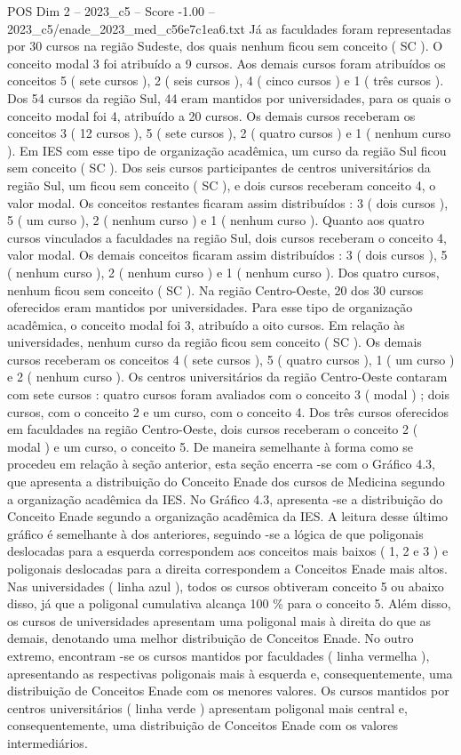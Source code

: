 \begin{textsample}{POS Dim 2 – 2023\_c5 – Score -1.00 – 2023\_c5/enade\_2023\_med\_c56e7c1ea6.txt}
Já as faculdades foram representadas por 30 cursos na região Sudeste, dos quais nenhum ficou sem conceito ( SC ).
O conceito modal 3 foi atribuído a 9 cursos.
Aos demais cursos foram atribuídos os conceitos 5 ( sete cursos ), 2 ( seis cursos ), 4 ( cinco cursos ) e 1 ( três cursos ).
Dos 54 cursos da região Sul, 44 eram mantidos por universidades, para os quais o conceito modal foi 4, atribuído a 20 cursos.
Os demais cursos receberam os conceitos 3 ( 12 cursos ), 5 ( sete cursos ), 2 ( quatro cursos ) e 1 ( nenhum curso ).
Em IES com esse tipo de organização acadêmica, um curso da região Sul ficou sem conceito ( SC ).
Dos seis cursos participantes de centros universitários da região Sul, um ficou sem conceito ( SC ), e dois cursos receberam conceito 4, o valor modal.
Os conceitos restantes ficaram assim distribuídos : 3 ( dois cursos ), 5 ( um curso ), 2 ( nenhum curso ) e 1 ( nenhum curso ).
Quanto aos quatro cursos vinculados a faculdades na região Sul, dois cursos receberam o conceito 4, valor modal.
Os demais conceitos ficaram assim distribuídos : 3 ( dois cursos ), 5 ( nenhum curso ), 2 ( nenhum curso ) e 1 ( nenhum curso ).
Dos quatro cursos, nenhum ficou sem conceito ( SC ).
Na região Centro-Oeste, 20 dos 30 cursos oferecidos eram mantidos por universidades.
Para esse tipo de organização acadêmica, o conceito modal foi 3, atribuído a oito cursos.
Em relação às universidades, nenhum curso da região ficou sem conceito ( SC ).
Os demais cursos receberam os conceitos 4 ( sete cursos ), 5 ( quatro cursos ), 1 ( um curso ) e 2 ( nenhum curso ).
Os centros universitários da região Centro-Oeste contaram com sete cursos : quatro cursos foram avaliados com o conceito 3 ( modal ) ; dois cursos, com o conceito 2 e um curso, com o conceito 4.
Dos três cursos oferecidos em faculdades na região Centro-Oeste, dois cursos receberam o conceito 2 ( modal ) e um curso, o conceito 5.
De maneira semelhante à forma como se procedeu em relação à seção anterior, esta seção encerra -se com o Gráfico 4.3, que apresenta a distribuição do Conceito Enade dos cursos de Medicina segundo a organização acadêmica da IES.
No Gráfico 4.3, apresenta -se a distribuição do Conceito Enade segundo a organização acadêmica da IES.
A leitura desse último gráfico é semelhante à dos anteriores, seguindo -se a lógica de que poligonais deslocadas para a esquerda correspondem aos conceitos mais baixos ( 1, 2 e 3 ) e poligonais deslocadas para a direita correspondem a Conceitos Enade mais altos.
Nas universidades ( linha azul ), todos os cursos obtiveram conceito 5 ou abaixo disso, já que a poligonal cumulativa alcança 100 \% para o conceito 5.
Além disso, os cursos de universidades apresentam uma poligonal mais à direita do que as demais, denotando uma melhor distribuição de Conceitos Enade.
No outro extremo, encontram -se os cursos mantidos por faculdades ( linha vermelha ), apresentando as respectivas poligonais mais à esquerda e, consequentemente, uma distribuição de Conceitos Enade com os menores valores.
Os cursos mantidos por centros universitários ( linha verde ) apresentam poligonal mais central e, consequentemente, uma distribuição de Conceitos Enade com os valores intermediários.

\end{textsample}
